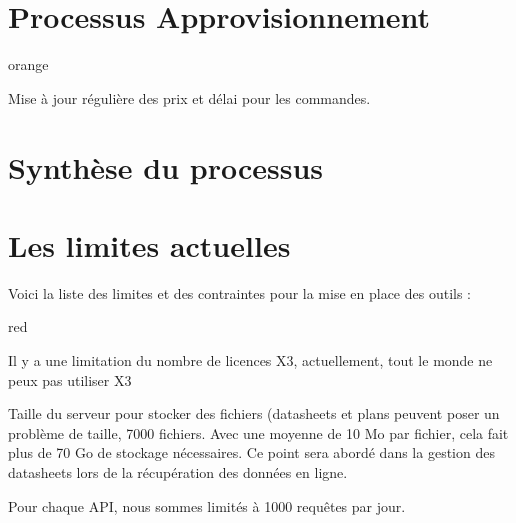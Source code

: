 \section{Processus Approvisionnement}

\begin{items}{orange}{\Bullet}
\item Mise à jour régulière des prix et délai pour les commandes.
\end{items}

\section{Synthèse du processus}


\section{Les limites actuelles}

Voici la liste des limites et des contraintes pour la mise en place des outils :
\begin{items}{red}{\Triangle}

\item Il y a une limitation du nombre de licences X3, actuellement, tout le monde ne peux pas
utiliser X3
\item Taille du serveur pour stocker des fichiers (datasheets et plans peuvent poser un problème
de taille, 7000 fichiers. Avec une moyenne de 10 Mo par fichier, cela fait plus de 70 Go de stockage nécessaires. Ce point sera abordé dans la gestion des datasheets lors de la récupération des données en ligne.
\item Pour chaque API, nous sommes limités à 1000 requêtes par jour.
\end{items}
